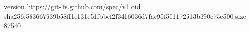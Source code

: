 version https://git-lfs.github.com/spec/v1
oid sha256:563667639b58ff1e131e51fbbef2f3416036d7fae95f501172513b390c73c500
size 87540
